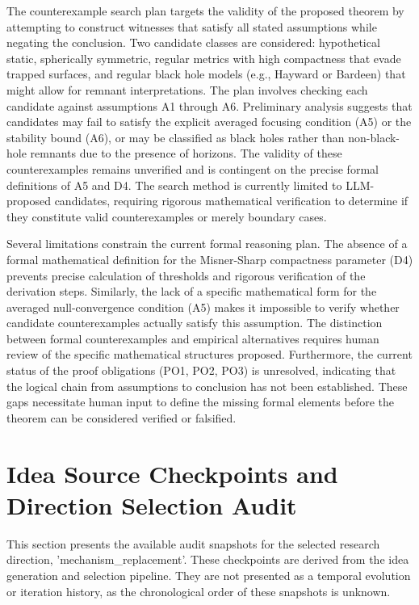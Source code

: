 \documentclass[conference]{IEEEtran}
\begin{document}
The counterexample search plan targets the validity of the proposed theorem by attempting to construct witnesses that satisfy all stated assumptions while negating the conclusion. Two candidate classes are considered: hypothetical static, spherically symmetric, regular metrics with high compactness that evade trapped surfaces, and regular black hole models (e.g., Hayward or Bardeen) that might allow for remnant interpretations. The plan involves checking each candidate against assumptions A1 through A6. Preliminary analysis suggests that candidates may fail to satisfy the explicit averaged focusing condition (A5) or the stability bound (A6), or may be classified as black holes rather than non-black-hole remnants due to the presence of horizons. The validity of these counterexamples remains unverified and is contingent on the precise formal definitions of A5 and D4. The search method is currently limited to LLM-proposed candidates, requiring rigorous mathematical verification to determine if they constitute valid counterexamples or merely boundary cases.

Several limitations constrain the current formal reasoning plan. The absence of a formal mathematical definition for the Misner-Sharp compactness parameter (D4) prevents precise calculation of thresholds and rigorous verification of the derivation steps. Similarly, the lack of a specific mathematical form for the averaged null-convergence condition (A5) makes it impossible to verify whether candidate counterexamples actually satisfy this assumption. The distinction between formal counterexamples and empirical alternatives requires human review of the specific mathematical structures proposed. Furthermore, the current status of the proof obligations (PO1, PO2, PO3) is unresolved, indicating that the logical chain from assumptions to conclusion has not been established. These gaps necessitate human input to define the missing formal elements before the theorem can be considered verified or falsified.

\appendices
\section{Idea Source Checkpoints and Direction Selection Audit}
This section presents the available audit snapshots for the selected research direction, 'mechanism\_replacement'. These checkpoints are derived from the idea generation and selection pipeline. They are not presented as a temporal evolution or iteration history, as the chronological order of these snapshots is unknown.
\end{document}
